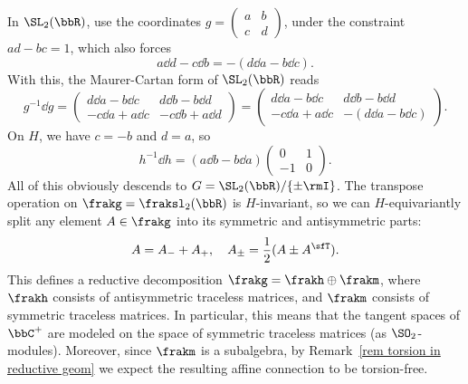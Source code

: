 \begin{example}
    In $\SL_2(\bbR)$, use the coordinates $g=\left(\begin{smallmatrix}
        a & b\\ c& d
    \end{smallmatrix}\right)$, under the constraint $ad-bc=1$, which also forces 
    \[a\dd d-c\dd b=-(d\dd a-b\dd c).\]
    With this, the Maurer-Cartan form of $\SL_2(\bbR)$ reads 
    \[g^{-1}\dd g=\begin{pmatrix}
        d\dd a -b\dd c & d\dd b-b\dd d\\
        -c\dd a+a\dd c & -c\dd b+a\dd d
    \end{pmatrix}=
    \begin{pmatrix}
        d\dd a-b\dd c & d\dd b-b\dd d\\
        -c\dd a+a\dd c & -(d\dd a-b\dd c)
    \end{pmatrix}.
    \]
    On $H$, we have $c=-b$ and $d=a$, so 
    \[h^{-1}\dd h=(a\dd b-b\dd a)\begin{pmatrix}
        0 & 1\\
        -1 & 0
    \end{pmatrix}.\]
    All of this obviously descends to $G=\SL_2(\bbR)\slash \{\pm \rmI\}$. The transpose operation on $\frakg=\fraksl_{2}(\bbR)$ is $H$-invariant, so we can $H$-equivariantly split any element $A\in\frakg$ into its symmetric and antisymmetric parts:
    \[A=A_-+A_+,\quad A_\pm=\frac12(A\pm A^\sfT ).\]
    This defines a reductive decomposition $\frakg=\frakh\oplus\frakm$, where $\frakh$ consists of antisymmetric traceless matrices, and $\frakm$ consists of symmetric traceless matrices. In particular, this means that the tangent spaces of $\bbC^+$ are modeled on the space of symmetric traceless matrices (as $\SO_2$-modules). Moreover, since $\frakm$ is a subalgebra, by Remark~\ref{rem torsion in reductive geom} we expect the resulting affine connection to be torsion-free.


\end{example}
